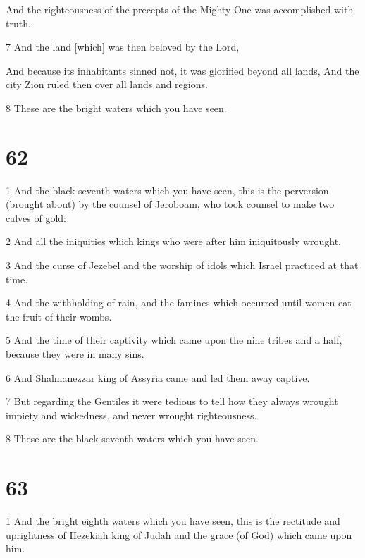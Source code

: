 \par And the righteousness of the precepts of the Mighty One was accomplished with truth.

\par 7 And the land [which] was then beloved by the Lord,

\par And because its inhabitants sinned not, it was glorified beyond all lands, And the city Zion ruled then over all lands and regions.

\par 8 These are the bright waters which you have seen.

\chapter{62}

\par 1 And the black seventh waters which you have seen, this is the perversion (brought about) by the counsel of Jeroboam, who took counsel to make two calves of gold: 

\par 2 And all the iniquities which kings who were after him iniquitously wrought. 

\par 3 And the curse of Jezebel and the worship of idols which Israel practiced at that time. 

\par 4 And the withholding of rain, and the famines which occurred until women eat the fruit of their wombs. 

\par 5 And the time of their captivity which came upon the nine tribes and a half, because they were in many sins. 

\par 6 And Shalmanezzar king of Assyria came and led them away captive. 

\par 7 But regarding the Gentiles it were tedious to tell how they always wrought impiety and wickedness, and never wrought righteousness. 

\par 8 These are the black seventh waters which you have seen.

\chapter{63}

\par 1 And the bright eighth waters which you have seen, this is the rectitude and uprightness of Hezekiah king of Judah and the grace (of God) which came upon him. 


